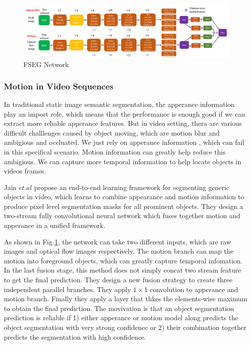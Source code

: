\begin{figure}
    \begin{center}
    \includegraphics[width=\textwidth]{figure/FSEG_NET.png}
    \end{center}
    \caption{FSEG Network}
    \label{FSEG}
\end{figure}

\subsubsection{Motion in Video Sequences}
In traditional static image semantic segmentation, the apperance information play an import role, which means that 
the performance is enough good if we can extract more reliable apperance features. But in video setting, thera are various
difficult challlenges caused by object moving, which are motion blur and ambigious and occluated. We just rely on apperance information
, which can  fail in this specifical scenario. Motion information can greatly help reduce this ambigious. We can capture more temporal information
to help locate objects in videos frames.

Jain $et.al$ \cite{Jain2017FusionSeg} propose an end-to-end learning framework for segmenting generic objects in video,
which learns to combine appearance and motion information to produce pixel level segmentation masks for all prominent objects.
They design a two-stream fully convolutional neural network which fuses together motion and apperance in a unified framework.

As shown in Fig \ref{FSEG}, the network can take two different inputs, which are raw images and optical flow images respectively.
The motion branch can map the motion into foreground objects, which can greatly capture temporal infomation.
In the last fusion stage, this method does not simply concat two stream feature to get the final prediction.
They design a new fusion strategy to create three independent parallel branches. They apply $1\times1$ convolution to apperance and
motion branch. Finally they apply a layer that thkes the elements-wise maximum to obtain the final prediction. The movivation is that 
an object segmentation prediction is reliable if 1) either apperance or motion model along predicts the object 
segmentation with very strong confidence or 2) their combination together predicts the segmentation with high confidence. 


